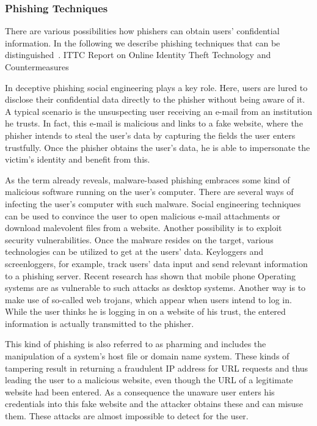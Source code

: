 \subsubsection{Phishing Techniques}
\label{s:phishing_techs}
There are various possibilities how phishers can obtain users' confidential information.
 In the following we describe phishing techniques that can be distinguished~\cite{jakobsson2006phishing, phishingtechniques}.
 ITTC Report on Online Identity Theft Technology and Countermeasures

\begin{description}[leftmargin=0cm]
	\item[Deceptive Phishing] In deceptive phishing social engineering plays a key role.
 Here, users are lured to disclose their confidential data directly to the phisher without being aware of it.
 A typical scenario is the unsuspecting user receiving an e-mail from an institution he trusts.
 In fact, this e-mail is malicious and links to a fake website, where the phisher intends to steal the user's data by capturing the fields the user enters trustfully.
 Once the phisher obtains the user's data, he is able to impersonate the victim's identity and benefit from this.

	\item[Malware-Based Phishing] As the term already reveals, malware-based phishing embraces some kind of malicious software running on the user's computer.
 There are several ways of infecting the user's computer with such malware.
 Social engineering techniques can be used to convince the user to open malicious e-mail attachments or download malevolent files from a website.
 Another possibility is to exploit security vulnerabilities.
 Once the malware resides on the target, various technologies can be utilized to get at the users' data.
 Keyloggers and screenloggers, for example, track users' data input and send relevant information to a phishing server.
 Recent research has shown that mobile phone Operating systems are as vulnerable to such attacks as desktop systems.
 Another way is to make use of so-called web trojans, which appear when users intend to log in.
 While the user thinks he is logging in on a website of his trust, the entered information is actually transmitted to the phisher.

	\item[DNS Based Phishing] This kind of phishing is also referred to as pharming and includes the manipulation of a system's host file or domain name system.
 These kinds of tampering result in returning a fraudulent IP address for URL requests and thus leading the user to a malicious website, even though the URL of a legitimate website had been entered.
 As a consequence the unaware user enters his credentials into this fake website and the attacker obtains these and can misuse them.
 These attacks are almost impossible to detect for the user.


\end{description}
